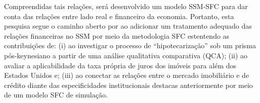 Compreendidas tais relações, será desenvolvido um modelo SSM-SFC para dar conta das relações entre lado real e financeiro da economia.
Portanto, esta pesquisa segue o caminho aberto por \textcite{brochier_supermultiplier_2018} ao adicionar um tratamento adequado das relações financeiras no SSM por meio da metodologia SFC estentendo as contribuições de: 
(i) \textcite{jorda_great_2014} ao investigar o processo de ``hipotecarização'' sob um prisma pós-keynesiano a partir de uma análise qualitativa comparativa (QCA); 
(ii) \textcite{teixeira_crescimento_2015} ao avaliar a aplicabilidade da taxa própria de juros dos imóveis para além dos Estados Unidos e;
(iii) \textcite{da_silveira_investimento_2019} ao conectar as relações entre o mercado imobiliário e de crédito diante das especificidades institucionais destacas anteriormente por meio de um modelo SFC de simulação. 


